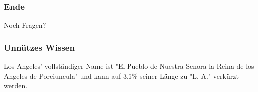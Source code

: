 \documentclass{beamer}
\begin{document}
\begin{frame}
\frametitle{Ende}
	\begin{center}
		Noch Fragen?
	\end{center}
\end{frame}

\begin{frame}
\frametitle{Unnützes Wissen}
	\begin{center}
		Los Angeles' vollständiger Name ist "El Pueblo de Nuestra Senora la Reina de los Angeles de Porciuncula" und kann auf 3,6\% seiner Länge zu "L. A." verkürzt werden.
	\end{center}
\end{frame}
\end{document}
